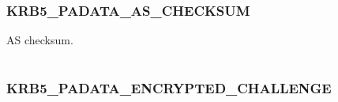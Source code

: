 \documentclass[letterpaper,10pt,english]{sphinxmanual}
\begin{document}
\begin{fulllineitems}
\label{appdev/refs/macros/KRB5_PADATA_AP_REQ:KRB5_PADATA_AP_REQ}
\end{fulllineitems}


\begin{tabulary}{\linewidth}{|L|L|}
\hline

 & 
\\
\hline\end{tabulary}



\subsubsection{KRB5\_PADATA\_AS\_CHECKSUM}
\label{appdev/refs/macros/KRB5_PADATA_AS_CHECKSUM:krb5-padata-as-checksum}\label{appdev/refs/macros/KRB5_PADATA_AS_CHECKSUM:krb5-padata-as-checksum-data}\label{appdev/refs/macros/KRB5_PADATA_AS_CHECKSUM::doc}

\begin{fulllineitems}
\label{appdev/refs/macros/KRB5_PADATA_AS_CHECKSUM:KRB5_PADATA_AS_CHECKSUM}
\end{fulllineitems}


AS checksum.

\begin{tabulary}{\linewidth}{|L|L|}
\hline

 & 
\\
\hline\end{tabulary}



\subsubsection{KRB5\_PADATA\_ENCRYPTED\_CHALLENGE}
\label{appdev/refs/macros/KRB5_PADATA_ENCRYPTED_CHALLENGE:krb5-padata-encrypted-challenge-data}\label{appdev/refs/macros/KRB5_PADATA_ENCRYPTED_CHALLENGE:krb5-padata-encrypted-challenge}\label{appdev/refs/macros/KRB5_PADATA_ENCRYPTED_CHALLENGE::doc}

\begin{fulllineitems}
\label{appdev/refs/macros/KRB5_PADATA_ENCRYPTED_CHALLENGE:KRB5_PADATA_ENCRYPTED_CHALLENGE}
\end{fulllineitems}
\end{document}

